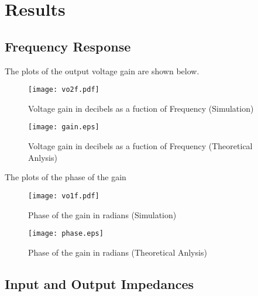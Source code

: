 \section{Results}
\label{sec:res}
\subsection{Frequency Response}
The plots of the output voltage gain  are shown below.
\begin{figure}[H] \centering
\texttt{[image: vo2f.pdf]}
\caption{Voltage gain in decibels as a fuction of Frequency (Simulation)}
\label{fig:vos}
\end{figure}

\begin{figure}[H] \centering
\texttt{[image: gain.eps]}
\caption{Voltage gain in decibels as a fuction of Frequency (Theoretical Anlysis)}
\label{fig:vot}
\end{figure}

The plots of the phase of the gain 
\begin{figure}[H] \centering
\texttt{[image: vo1f.pdf]}
\caption{Phase of the gain in radians (Simulation)}
\label{fig:vos}
\end{figure}

\begin{figure}[H] \centering
\texttt{[image: phase.eps]}
\caption{Phase of the gain in radians (Theoretical Anlysis)}
\label{fig:vot}
\end{figure}



\subsection{Input and Output Impedances}